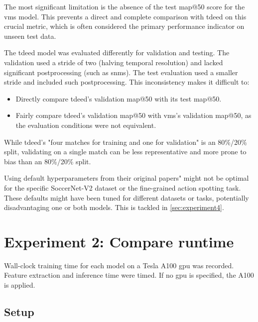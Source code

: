 The most significant limitation is the absence of the test \acrshort{map}@50 score for the \acrshort{vms} model. This prevents a direct and complete comparison with \acrshort{tdeed} on this crucial metric, which is often considered the primary performance indicator on unseen test data.

The \acrshort{tdeed} model was evaluated differently for validation and testing. The validation used a stride of two (halving temporal resolution) and lacked significant postprocessing (such as \acrshort{snms}). The test evaluation used a smaller stride and included such postprocessing. This inconsistency makes it difficult to:

\begin{itemize}
    \item Directly compare \acrshort{tdeed}'s validation \acrshort{map}@50 with its test \acrshort{map}@50.
    \item Fairly compare \acrshort{tdeed}'s validation \acrshort{map}@50 with \acrshort{vms}'s validation \acrshort{map}@50, as the evaluation conditions were not equivalent.
\end{itemize}

While \acrshort{tdeed}'s "four matches for training and one for validation" is an 80\%/20\% split, validating on a single match can be less representative and more prone to bias than an 80\%/20\% split.

Using default hyperparameters from their original papers" might not be optimal for the specific SoccerNet-V2 dataset or the fine-grained action spotting task. These defaults might have been tuned for different datasets or tasks, potentially disadvantaging one or both models. This is tackled in \autoref{sec:experiment4}.



\section{Experiment 2: Compare runtime}
\label{sec:experiment2}

Wall-clock training time for each model on a Tesla A100 \acrshort{gpu} was recorded. Feature extraction and inference time were timed. If no \acrshort{gpu} is specified, the A100 is applied. 

\subsection{Setup}
\label{ssec:ex2_setup}

